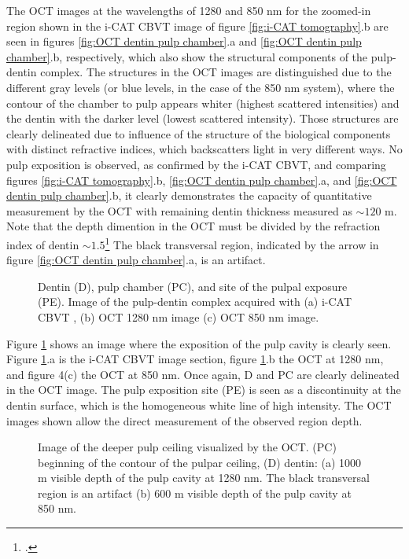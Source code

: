 \documentclass[12pt,twoside,english]{book}
\renewcommand{\~}{\perispomeni}%
\DeclareRobustCommand{\textgreek}[1]{\leavevmode{\greektext #1}}
\numberwithin{equation}{section}
\numberwithin{figure}{section}
\begin{document}
The OCT images at the wavelengths of 1280 and 850 nm for the zoomed-in region shown in the i-CAT CBVT image of figure \ref{fig:i-CAT tomography}.b are seen in figures \ref{fig:OCT dentin pulp chamber}.a and \ref{fig:OCT dentin pulp chamber}.b, respectively, which also show the structural components of the pulp-dentin complex. The structures in the OCT images are distinguished due to the different gray levels (or blue levels, in the case of the 850 nm system), where the contour of the chamber to pulp appears whiter (highest scattered intensities) and the dentin with the darker level (lowest scattered intensity). Those structures are clearly delineated due to influence of the structure of the biological components with distinct refractive indices, which backscatters light in very different ways. No pulp exposition is observed, as confirmed by the i-CAT CBVT, and comparing figures \ref{fig:i-CAT tomography}.b, \ref{fig:OCT dentin pulp chamber}.a, and \ref{fig:OCT dentin pulp chamber}.b, it clearly demonstrates the capacity of quantitative measurement by the OCT with remaining dentin thickness measured as $\sim120$ \textgreek{m}m. Note that the depth dimention in the OCT must be divided by the refraction index of dentin $\sim1.5$\footcite{Colston:1998p1677} The black transversal region, indicated by the arrow in figure \ref{fig:OCT dentin pulp chamber}.a, is an artifact.
\begin{figure}[h]
\centering{}
\caption{Dentin (D), pulp chamber (PC), and site of the pulpal exposure (PE). Image of the pulp-dentin complex acquired with (a) i-CAT CBVT , (b) OCT 1280 nm image (c) OCT 850 nm image.\label{fig:pulp exposure}}
\end{figure}

Figure \ref{fig:pulp exposure} shows an image where the exposition of the pulp cavity is clearly seen. Figure \ref{fig:pulp exposure}.a is the i-CAT CBVT image section, figure \ref{fig:pulp exposure}.b the OCT at 1280 nm, and figure 4(c) the OCT at 850 nm. Once again, D and PC are clearly delineated in the OCT image. The pulp exposition site (PE) is seen as a discontinuity at the dentin surface, which is the homogeneous white line of high intensity. The OCT images shown allow the direct measurement of the observed region depth.
\begin{figure}[h]
\centering{}
\caption{Image of the deeper pulp ceiling visualized by the OCT. (PC) beginning of the contour of the pulpar ceiling, (D) dentin: (a) 1000 \textgreek{m}m visible depth of the pulp cavity at 1280 nm. The black transversal region is an artifact (b) 600 \textgreek{m}m visible depth of the pulp cavity at 850 nm.\label{fig:deep ceiling}}
\end{figure}
\end{document}
